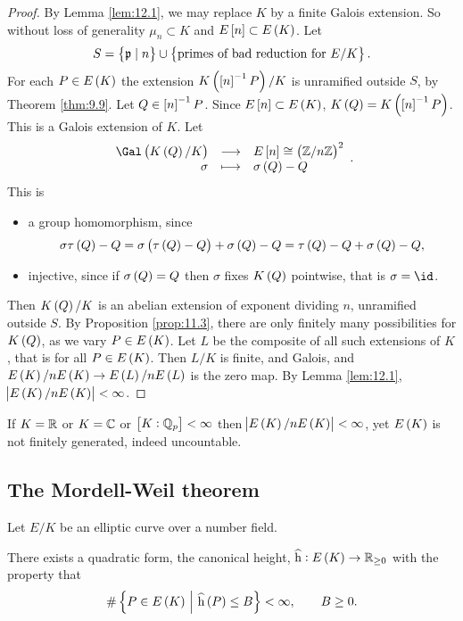 \begin{proof}
By Lemma \ref{lem:12.1}, we may replace $ K $ by a finite Galois extension. So without loss of generality $ \mu_n \subset K $ and $ E\sbr{n} \subset E\br{K} $. Let
$$ S = \cbr{\ppp \mid n} \cup \cbr{\text{primes of bad reduction for} \ E / K}. $$
For each $ P \in E\br{K} $ the extension $ K\br{\sbr{n}^{-1}P} / K $ is unramified outside $ S $, by Theorem \ref{thm:9.9}. Let $ Q \in \sbr{n}^{-1}P $. Since $ E\sbr{n} \subset E\br{K} $, $ K\br{Q} = K\br{\sbr{n}^{-1}P} $. This is a Galois extension of $ K $. Let
$$ \function{\Gal\br{K\br{Q} / K}}{E\sbr{n} \cong \br{\ZZ / n\ZZ}^2}{\sigma}{\sigma\br{Q} - Q}. $$
This is
\begin{itemize}
\item a group homomorphism, since
$$ \sigma\tau\br{Q} - Q = \sigma\br{\tau\br{Q} - Q} + \sigma\br{Q} - Q = \tau\br{Q} - Q + \sigma\br{Q} - Q, $$
\item injective, since if $ \sigma\br{Q} = Q $ then $ \sigma $ fixes $ K\br{Q} $ pointwise, that is $ \sigma = \id $.
\end{itemize}
Then $ K\br{Q} / K $ is an abelian extension of exponent dividing $ n $, unramified outside $ S $. By Proposition \ref{prop:11.3}, there are only finitely many possibilities for $ K\br{Q} $, as we vary $ P \in E\br{K} $. Let $ L $ be the composite of all such extensions of $ K $, that is for all $ P \in E\br{K} $. Then $ L / K $ is finite, and Galois, and $ E\br{K} / nE\br{K} \to E\br{L} / nE\br{L} $ is the zero map. By Lemma \ref{lem:12.1}, $ \abs{E\br{K} / nE\br{K}} < \infty $.
\end{proof}

\begin{remark*}
If $ K = \mathbb{R} $ or $ K = \mathbb{C} $ or $ \sbr{K : \QQ_p} < \infty $ then $ \abs{E\br{K} / nE\br{K}} < \infty $, yet $ E\br{K} $ is not finitely generated, indeed uncountable.
\end{remark*}

\pagebreak

\subsection{The Mordell-Weil theorem}

Let $ E / K $ be an elliptic curve over a number field.

\begin{fact*}
There exists a quadratic form, the canonical height, $ \widehat{\h} : E\br{K} \to \RR_{\ge 0} $ with the property that
\begin{equation}
\label{eq:13}
\#\cbr{P \in E\br{K} \st \widehat{\h}\br{P} \le B} < \infty, \qquad B \ge 0.
\end{equation}
\end{fact*}

